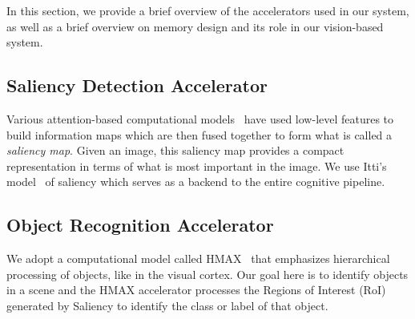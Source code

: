 In this section, we provide a brief overview of the accelerators used in our system, as well as a brief overview on memory design and its role in our vision-based system. 

\subsection{Saliency Detection Accelerator}
Various attention-based computational models~\cite{Itti2001,Bruce2009a} have used low-level features to build information maps which are then fused together to form what is called a \emph{saliency map}. Given an image, this saliency map provides a compact representation in terms of what is most important in the image. 
We use Itti's model~\cite{Peters2007} of saliency which serves as a backend to the entire cognitive pipeline. 

\subsection{Object Recognition Accelerator}

We adopt a computational model called HMAX~\cite{Mutch2008} that emphasizes hierarchical processing of objects, like in the visual cortex. Our goal here is to identify objects in a scene and the HMAX accelerator processes the Regions of Interest (RoI) generated by Saliency to identify the class or label of that object. 

